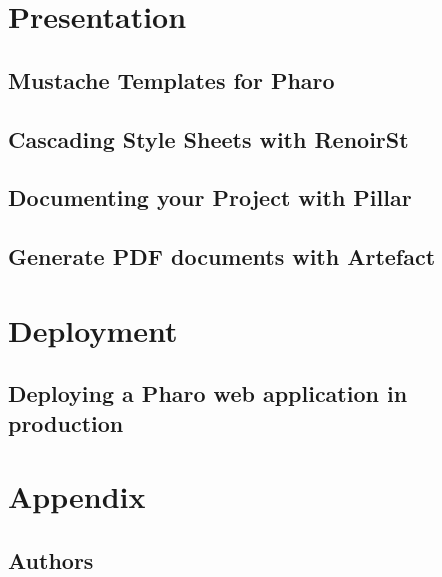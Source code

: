 \documentclass[10pt,twoside]{root/support/latex/sbabook}
\begin{document}
\part{Presentation}

\chapter{Mustache Templates for Pharo}


\chapter{Cascading Style Sheets with RenoirSt}


\chapter{Documenting your Project with Pillar}



\chapter{Generate PDF documents with Artefact}


\part{Deployment}

\chapter{Deploying a Pharo web application in production}


\appendix

\part{Appendix}

\chapter{Authors}
\end{document}

